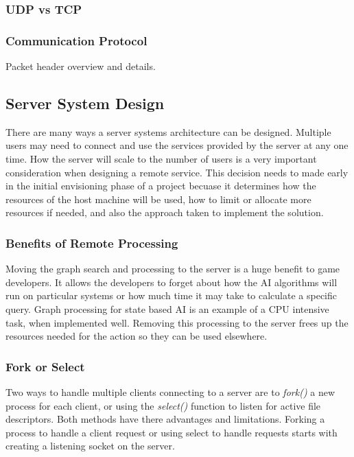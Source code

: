 \documentclass[12pt,a4paper,titlepage]{article}
\begin{document}
\subsubsection{UDP vs TCP}

\subsubsection{Communication Protocol}

Packet header overview and details.\\

\subsection{Server System Design}

There are many ways a server systems architecture can be designed. Multiple users may need to connect and use the services provided by the server at any one time. How the server will scale to the number of users is a very important consideration when designing a remote service. This decision needs to made early in the initial envisioning phase of a project becuase it determines how the resources of the host machine will be used, how to limit or allocate more resources if needed, and also the approach taken to implement the solution.\\

\subsubsection{Benefits of Remote Processing}

Moving the graph search and processing to the server is a huge benefit to game developers. It allows the developers to forget about how the AI algorithms will run on particular systems or how much time it may take to calculate a specific query. Graph processing for state based AI is an example of a CPU intensive task, when implemented well. Removing this processing to the server frees up the resources needed for the action so they can be used elsewhere.\\


\subsubsection{Fork or Select}

Two ways to handle multiple clients connecting to a server are to \textit{fork()} a new process for each client, or using the \textit{select()} function to listen for active file descriptors. Both methods have there advantages and limitations. Forking a process to handle a client request or using select to handle requests starts with creating a listening socket on the server. 
\end{document}
